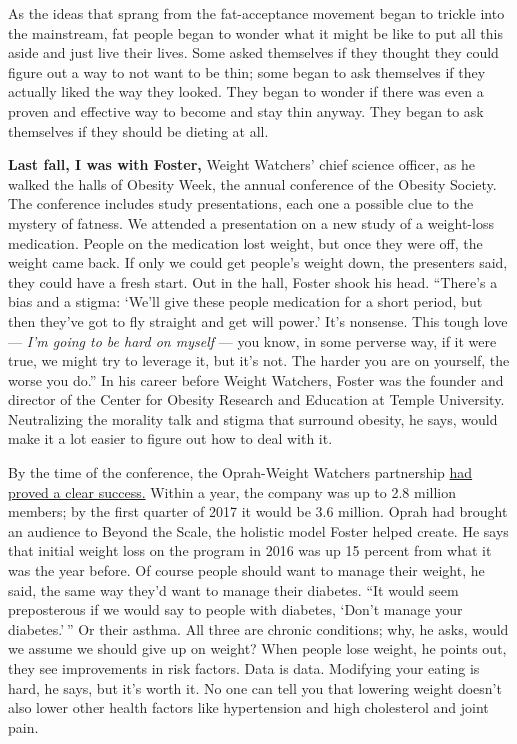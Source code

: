 As the ideas that sprang from the fat-acceptance movement began to
trickle into the mainstream, fat people began to wonder what it might be
like to put all this aside and just live their lives. Some asked
themselves if they thought they could figure out a way to not want to be
thin; some began to ask themselves if they actually liked the way they
looked. They began to wonder if there was even a proven and effective
way to become and stay thin anyway. They began to ask themselves if they
should be dieting at all.

\textbf{Last fall, I was with Foster,} Weight Watchers' chief science
officer, as he walked the halls of Obesity Week, the annual conference
of the Obesity Society. The conference includes study presentations,
each one a possible clue to the mystery of fatness. We attended a
presentation on a new study of a weight-loss medication. People on the
medication lost weight, but once they were off, the weight came back. If
only we could get people's weight down, the presenters said, they could
have a fresh start. Out in the hall, Foster shook his head. ``There's a
bias and a stigma: `We'll give these people medication for a short
period, but then they've got to fly straight and get will power.' It's
nonsense. This tough love --- \emph{I'm going to be hard on myself} ---
you know, in some perverse way, if it were true, we might try to
leverage it, but it's not. The harder you are on yourself, the worse you
do.'' In his career before Weight Watchers, Foster was the founder and
director of the Center for Obesity Research and Education at Temple
University. Neutralizing the morality talk and stigma that surround
obesity, he says, would make it a lot easier to figure out how to deal
with it.

By the time of the conference, the Oprah-Weight Watchers partnership
\href{https://www.nytimes3xbfgragh.onion/2015/10/20/business/dealbook/shares-of-weight-watchers-jump-as-oprah-winfrey-takes-a-stake.html}{had
proved a clear success.} Within a year, the company was up to 2.8
million members; by the first quarter of 2017 it would be 3.6 million.
Oprah had brought an audience to Beyond the Scale, the holistic model
Foster helped create. He says that initial weight loss on the program in
2016 was up 15 percent from what it was the year before. Of course
people should want to manage their weight, he said, the same way they'd
want to manage their diabetes. ``It would seem preposterous if we would
say to people with diabetes, `Don't manage your diabetes.' '' Or their
asthma. All three are chronic conditions; why, he asks, would we assume
we should give up on weight? When people lose weight, he points out,
they see improvements in risk factors. Data is data. Modifying your
eating is hard, he says, but it's worth it. No one can tell you that
lowering weight doesn't also lower other health factors like
hypertension and high cholesterol and joint pain.

